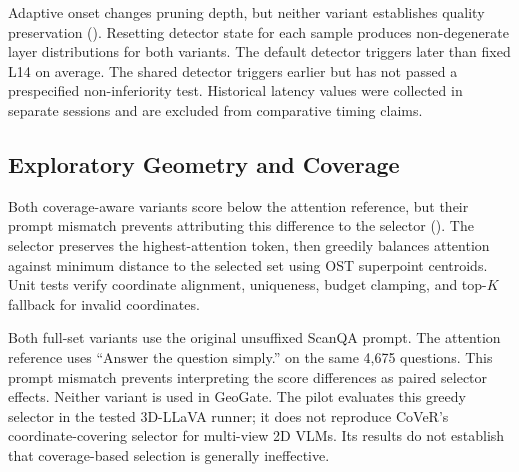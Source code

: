 Adaptive onset changes pruning depth, but neither variant establishes quality preservation (). Resetting detector state for each sample produces non-degenerate layer distributions for both variants. The default detector triggers later than fixed L14 on average. The shared detector triggers earlier but has not passed a prespecified non-inferiority test. Historical latency values were collected in separate sessions and are excluded from comparative timing claims.

\begin{table}[t]
\centering
\caption{Corrected adaptive-onset evaluation on LLaVA-3D ScanQA.}
\label{tab:supp_adaptive}
\end{table}

\subsection{Exploratory Geometry and Coverage}
Both coverage-aware variants score below the attention reference, but their prompt mismatch prevents attributing this difference to the selector (). The selector preserves the highest-attention token, then greedily balances attention against minimum distance to the selected set using OST superpoint centroids. Unit tests verify coordinate alignment, uniqueness, budget clamping, and top-$K$ fallback for invalid coordinates.

Both full-set variants use the original unsuffixed ScanQA prompt. The attention reference uses ``Answer the question simply.'' on the same 4,675 questions. This prompt mismatch prevents interpreting the score differences as paired selector effects. Neither variant is used in GeoGate. The pilot evaluates this greedy selector in the tested 3D-LLaVA runner; it does not reproduce CoVeR's coordinate-covering selector for multi-view 2D VLMs. Its results do not establish that coverage-based selection is generally ineffective.

\begin{table}[t]
\centering
\caption{Unmatched-prompt coverage pilot on 3D-LLaVA ScanQA.}
\label{tab:supp_coverage}
\end{table}


